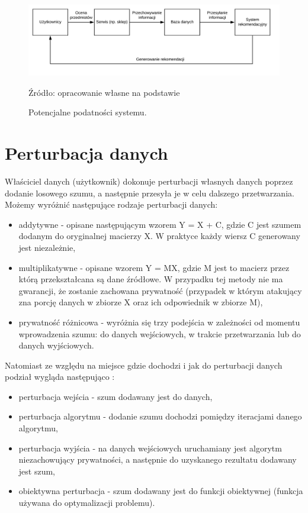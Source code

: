 \begin{figure}
    \centering
    \includegraphics[scale=0.85]{images/podatnosci.png}
    \caption{Potencjalne podatności systemu.}    Źródło: opracowanie własne na podstawie \cite{practicalPrivacy}

    \label{fig:podatnosci}
\end{figure}
\section{Perturbacja danych}
Właściciel danych (użytkownik) dokonuje perturbacji własnych danych poprzez dodanie losowego szumu, a następnie przesyła je w celu dalszego przetwarzania.
Możemy wyróżnić następujące rodzaje perturbacji danych:
\begin{itemize}
    \item addytywne - opisane następującym wzorem 
    Y = X + C, gdzie C jest szumem dodanym do oryginalnej macierzy X. W praktyce każdy wiersz C generowany jest niezależnie,
    \item multiplikatywne - opisane wzorem Y = MX, gdzie M jest to macierz przez którą przekształcana są dane źródłowe. W przypadku tej metody nie ma gwarancji, że zostanie zachowana prywatność (przypadek w którym atakujący zna porcję danych w zbiorze X oraz ich odpowiednik w zbiorze M),
    \item prywatność różnicowa - wyróżnia się trzy podejścia w zależności od momentu wprowadzenia szumu: do danych wejściowych, w trakcie przetwarzania lub do danych wyjściowych.
\end{itemize}

Natomiast ze względu na miejsce gdzie dochodzi i jak do perturbacji danych podział wygląda następująco \cite{PPML}:
\begin{itemize}
    \item perturbacja wejścia - szum dodawany jest do danych,
    \item perturbacja algorytmu - dodanie szumu dochodzi pomiędzy iteracjami danego algorytmu,
    \item perturbacja wyjścia - na danych wejściowych uruchamiany jest algorytm niezachowujący prywatności, a następnie do uzyskanego rezultatu dodawany jest szum,
    \item obiektywna perturbacja - szum dodawany jest do funkcji obiektywnej (funkcja używana do optymalizacji problemu).
\end{itemize}

